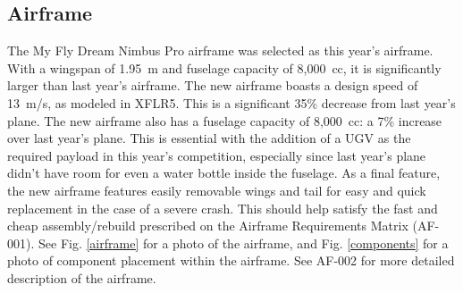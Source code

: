\documentclass{auvsi_doc}
\begin{document}
\subsection{Airframe}
The My Fly Dream Nimbus Pro airframe was selected as this year's airframe. With a wingspan of 1.95~m and fuselage capacity of 8,000~cc, it is significantly larger than last year's airframe. The new airframe boasts a design speed of 13~m/s, as modeled in XFLR5. This is a significant 35\% decrease from last year's plane. The new airframe also has a fuselage capacity of 8,000~cc: a 7\% increase over last year's plane. This is essential with the addition of a UGV as the required payload in this year's competition, especially since last year's plane didn't have room for even a water bottle inside the fuselage. As a final feature, the new airframe features easily removable wings and tail for easy and quick replacement in the case of a severe crash. This should help satisfy the fast and cheap assembly/rebuild prescribed on the Airframe Requirements Matrix (AF-001). See Fig. \ref{airframe} for a photo of the airframe, and Fig. \ref{components} for a photo of component placement within the airframe. See AF-002 for more detailed description of the airframe.
\end{document}
